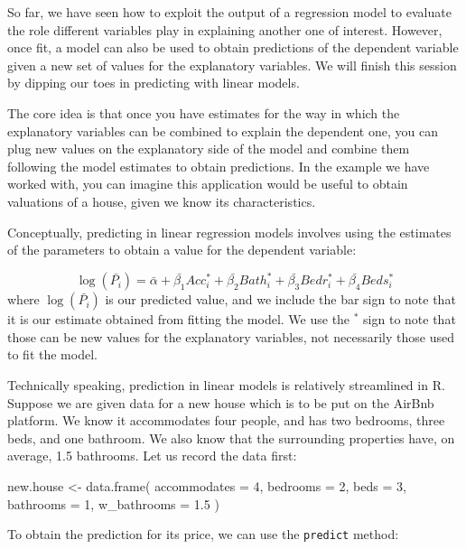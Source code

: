 \documentclass[
  letterpaper,
  DIV=11,
  numbers=noendperiod,
  oneside]{scrreprt}
\newenvironment{Shaded}{\begin{snugshade}}{\end{snugshade}}
\newcommand{\AttributeTok}[1]{\textcolor[rgb]{0.40,0.45,0.13}{#1}}
\newcommand{\DecValTok}[1]{\textcolor[rgb]{0.68,0.00,0.00}{#1}}
\newcommand{\FloatTok}[1]{\textcolor[rgb]{0.68,0.00,0.00}{#1}}
\newcommand{\FunctionTok}[1]{\textcolor[rgb]{0.28,0.35,0.67}{#1}}
\newcommand{\NormalTok}[1]{\textcolor[rgb]{0.00,0.23,0.31}{#1}}
\newcommand{\OtherTok}[1]{\textcolor[rgb]{0.00,0.23,0.31}{#1}}
\begin{document}
So far, we have seen how to exploit the output of a regression model to
evaluate the role different variables play in explaining another one of
interest. However, once fit, a model can also be used to obtain
predictions of the dependent variable given a new set of values for the
explanatory variables. We will finish this session by dipping our toes
in predicting with linear models.

The core idea is that once you have estimates for the way in which the
explanatory variables can be combined to explain the dependent one, you
can plug new values on the explanatory side of the model and combine
them following the model estimates to obtain predictions. In the example
we have worked with, you can imagine this application would be useful to
obtain valuations of a house, given we know its characteristics.

Conceptually, predicting in linear regression models involves using the
estimates of the parameters to obtain a value for the dependent
variable:

\[
\log(\bar{P_i}) = \bar{\alpha} + \bar{\beta_1} Acc_i^* + \bar{\beta_2} Bath_i^* + \bar{\beta_3} Bedr_i^* + \bar{\beta_4} Beds_i^*
\] where \(\log(\bar{P_i})\) is our predicted value, and we include the
bar sign to note that it is our estimate obtained from fitting the
model. We use the \(^*\) sign to note that those can be new values for
the explanatory variables, not necessarily those used to fit the model.

Technically speaking, prediction in linear models is relatively
streamlined in R. Suppose we are given data for a new house which is to
be put on the AirBnb platform. We know it accommodates four people, and
has two bedrooms, three beds, and one bathroom. We also know that the
surrounding properties have, on average, 1.5 bathrooms. Let us record
the data first:

\begin{Shaded}
\begin{Highlighting}[]
\NormalTok{new.house }\OtherTok{\textless{}{-}} \FunctionTok{data.frame}\NormalTok{(}
  \AttributeTok{accommodates =} \DecValTok{4}\NormalTok{, }
  \AttributeTok{bedrooms =} \DecValTok{2}\NormalTok{,}
  \AttributeTok{beds =} \DecValTok{3}\NormalTok{,}
  \AttributeTok{bathrooms =} \DecValTok{1}\NormalTok{,}
  \AttributeTok{w\_bathrooms =} \FloatTok{1.5}
\NormalTok{)}
\end{Highlighting}
\end{Shaded}

To obtain the prediction for its price, we can use the \texttt{predict}
method:
\end{document}
